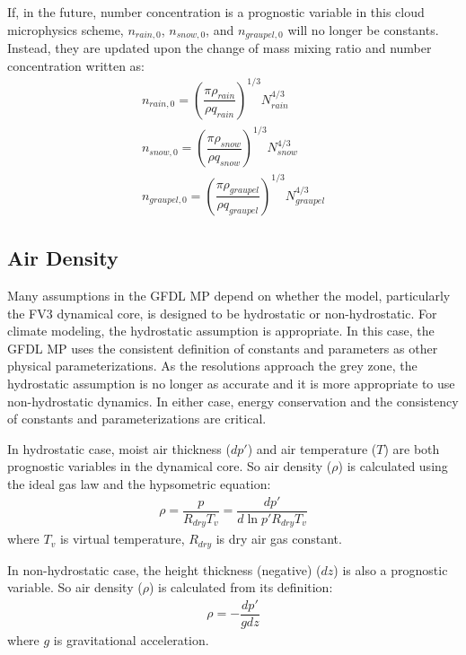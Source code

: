 \documentclass[letterpaper,titlepage,10pt]{article}
\numberwithin{equation}{section}
\begin{document}
If, in the future, number concentration is a prognostic variable in this cloud microphysics scheme, $n_{rain,0}$, $n_{snow,0}$, and $n_{graupel,0}$ will no longer be constants. Instead, they are updated upon the change of mass mixing ratio and number concentration written as:
\begin{gather}
	n_{rain,0} = \left(\dfrac{\pi \rho_{rain}}{\rho q_{rain}} \right)^{1/3} N_{rain}^{4/3} \\
	n_{snow,0} = \left(\dfrac{\pi \rho_{snow}}{\rho q_{snow}} \right)^{1/3} N_{snow}^{4/3} \\
	n_{graupel,0} = \left(\dfrac{\pi \rho_{graupel}}{\rho q_{graupel}} \right)^{1/3} N_{graupel}^{4/3}
\end{gather}


\subsection{Air Density}

Many assumptions in the GFDL MP depend on whether the model, particularly the FV3 dynamical core, is designed to be hydrostatic or non-hydrostatic. For climate modeling, the hydrostatic assumption is appropriate. In this case, the GFDL MP uses the consistent definition of constants and parameters as other physical parameterizations. As the resolutions approach the grey zone, the hydrostatic assumption is no longer as accurate and it is more appropriate to use non-hydrostatic dynamics. In either case, energy conservation and the consistency of constants and parameterizations are critical. 

In hydrostatic case, moist air thickness ($dp'$) and air temperature ($T$) are both prognostic variables in the dynamical core. So air density ($\rho$) is calculated using the ideal gas law and the hypsometric equation:
\begin{gather}
	\rho = \dfrac{p}{R_{dry} T_v} = \dfrac{dp'}{d \ln p' R_{dry} T_v}
\end{gather}
where $T_v$ is virtual temperature, $R_{dry}$ is dry air gas constant.

In non-hydrostatic case, the height thickness (negative) ($dz$) is also a prognostic variable. So air density ($\rho$) is calculated from its definition:
\begin{gather}
	\rho = - \dfrac{dp'}{g dz}
\end{gather}
where $g$ is gravitational acceleration.
\end{document}
